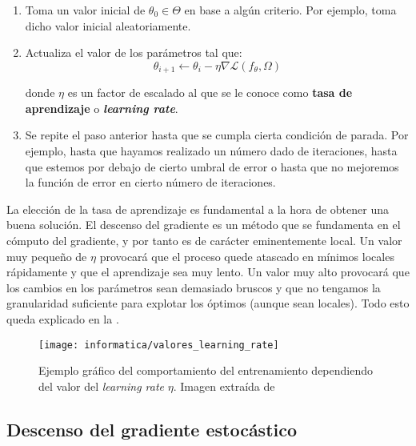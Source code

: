 \begin{enumerate}
	\item Toma un valor inicial de $\theta_0 \in \Theta$ en base a algún criterio. Por ejemplo, toma dicho valor inicial aleatoriamente.
	\item Actualiza el valor de los parámetros tal que:
	      \begin{equation}
		      \theta_{i + 1} \leftarrow \theta_i - \eta \nabla \mathcal{L}(f_\theta, \Omega)
	      \end{equation}

	      donde $\eta$ es un factor de escalado al que se le conoce como \textbf{tasa de aprendizaje} o \textbf{\textit{learning rate}}.
	\item Se repite el paso anterior hasta que se cumpla cierta condición de parada. Por ejemplo, hasta que hayamos realizado un número dado de iteraciones, hasta que estemos por debajo de cierto umbral de error o hasta que no mejoremos la función de error en cierto número de iteraciones.
\end{enumerate}

La elección de la tasa de aprendizaje es fundamental a la hora de obtener una buena solución. El descenso del gradiente es un método que se fundamenta en el cómputo del gradiente, y por tanto es de carácter eminentemente local. Un valor muy pequeño de $\eta$ provocará que el proceso quede atascado en mínimos locales rápidamente y que el aprendizaje sea muy lento. Un valor muy alto provocará que los cambios en los parámetros sean demasiado bruscos y que no tengamos la granularidad suficiente para explotar los óptimos (aunque sean locales). Todo esto queda explicado en la .

\begin{figure}[h]
	\centering
	\texttt{[image: informatica/valores\_learning\_rate]}
	\caption{Ejemplo gráfico del comportamiento del entrenamiento dependiendo del valor del \textit{learning rate} $\eta$. Imagen extraída de \cite{informatica:libro_clase_aprendizaje_automatico}}
	\label{img:valores_learning_rate}
\end{figure}

\subsection{Descenso del gradiente estocástico}

